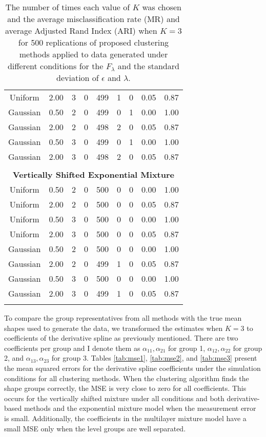 \begin{table}[ht]
\begin{center}
\begin{tabular}{ccc|cccccc}
  Uniform & 2.00 &   3 & 0 & 499 & 1 & 0 & 0.05 & 0.87 \\ 
  Gaussian & 0.50 &   2 & 0 & 499 & 0 & 1 & 0.00 & 1.00 \\ 
  Gaussian & 2.00 &   2 & 0 & 498 & 2 & 0 & 0.05 & 0.87 \\ 
  Gaussian & 0.50 &   3 & 0 & 499 & 0 & 1 & 0.00 & 1.00 \\ 
  Gaussian & 2.00 &   3 & 0 & 498 & 2 & 0 & 0.05 & 0.87 \\ 
   \\ \multicolumn{9}{c}{\textbf{Vertically Shifted Exponential Mixture}}\\Uniform & 0.50 &   2 & 0 & 500 & 0 & 0 & 0.00 & 1.00 \\ 
  Uniform & 2.00 &   2 & 0 & 500 & 0 & 0 & 0.05 & 0.87 \\ 
  Uniform & 0.50 &   3 & 0 & 500 & 0 & 0 & 0.00 & 1.00 \\ 
  Uniform & 2.00 &   3 & 0 & 500 & 0 & 0 & 0.05 & 0.87 \\ 
  Gaussian & 0.50 &   2 & 0 & 500 & 0 & 0 & 0.00 & 1.00 \\ 
  Gaussian & 2.00 &   2 & 0 & 499 & 1 & 0 & 0.05 & 0.87 \\ 
  Gaussian & 0.50 &   3 & 0 & 500 & 0 & 0 & 0.00 & 1.00 \\ 
  Gaussian & 2.00 &   3 & 0 & 499 & 1 & 0 & 0.05 & 0.87 \\ 
   \thickhline\end{tabular}
\caption{The number of times each value of $K$ was chosen and the average misclassification rate (MR) and average Adjusted Rand Index (ARI) when $K=3$ for 500 replications of proposed clustering methods applied to data generated under different conditions for the $F_{\lambda}$ and the standard deviation of $\epsilon$ and $\lambda$.}
\label{tab:freq3}
\end{center}
\end{table}
To compare the group representatives from all methods with the true mean shapes used to generate the data, we transformed the estimates when $K=3$ to coefficients of the derivative spline as previously mentioned. There are two coefficients per group and I denote them as $\alpha_{11},\alpha_{21}$ for group 1, $\alpha_{12},\alpha_{22}$ for group 2, and $\alpha_{13},\alpha_{23}$ for group 3. Tables \ref{tab:mse1}, \ref{tab:mse2}, and \ref{tab:mse3} present the mean squared errors for the derivative spline coefficients under the simulation conditions for all clustering methods. When the clustering algorithm finds the shape groups correctly, the MSE is very close to zero for all coefficients. This occurs for the vertically shifted mixture under all conditions and both derivative-based methods and the exponential mixture model when the measurement error is small. Additionally, the coefficients in the multilayer mixture model have a small MSE only when the level groups are well separated.

